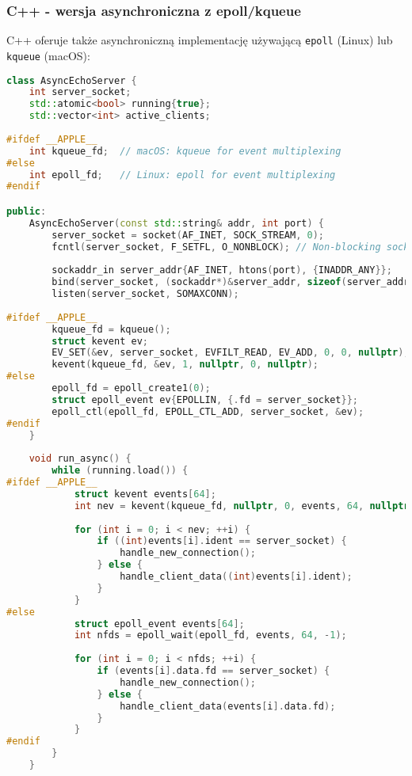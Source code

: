 \subsubsection{C++ - wersja asynchroniczna z epoll/kqueue}
C++ oferuje także asynchroniczną implementację używającą \texttt{epoll} (Linux) lub \texttt{kqueue} \mbox{(macOS)}:
\begin{lstlisting}[language=C++, style=VS2017,  caption={Async Echo Serwer w C++ z event loop}, label={lst:cpp_async_echo_server}]
class AsyncEchoServer {
    int server_socket;
    std::atomic<bool> running{true};
    std::vector<int> active_clients;
    
#ifdef __APPLE__
    int kqueue_fd;  // macOS: kqueue for event multiplexing
#else
    int epoll_fd;   // Linux: epoll for event multiplexing  
#endif

public:
    AsyncEchoServer(const std::string& addr, int port) {
        server_socket = socket(AF_INET, SOCK_STREAM, 0);
        fcntl(server_socket, F_SETFL, O_NONBLOCK); // Non-blocking socket
        
        sockaddr_in server_addr{AF_INET, htons(port), {INADDR_ANY}};
        bind(server_socket, (sockaddr*)&server_addr, sizeof(server_addr));
        listen(server_socket, SOMAXCONN);
        
#ifdef __APPLE__
        kqueue_fd = kqueue();
        struct kevent ev;
        EV_SET(&ev, server_socket, EVFILT_READ, EV_ADD, 0, 0, nullptr);
        kevent(kqueue_fd, &ev, 1, nullptr, 0, nullptr);
#else
        epoll_fd = epoll_create1(0);
        struct epoll_event ev{EPOLLIN, {.fd = server_socket}};
        epoll_ctl(epoll_fd, EPOLL_CTL_ADD, server_socket, &ev);
#endif
    }
    
    void run_async() {
        while (running.load()) {
#ifdef __APPLE__
            struct kevent events[64];
            int nev = kevent(kqueue_fd, nullptr, 0, events, 64, nullptr);
            
            for (int i = 0; i < nev; ++i) {
                if ((int)events[i].ident == server_socket) {
                    handle_new_connection();
                } else {
                    handle_client_data((int)events[i].ident);
                }
            }
#else
            struct epoll_event events[64];
            int nfds = epoll_wait(epoll_fd, events, 64, -1);
            
            for (int i = 0; i < nfds; ++i) {
                if (events[i].data.fd == server_socket) {
                    handle_new_connection();
                } else {
                    handle_client_data(events[i].data.fd);
                }
            }
#endif
        }
    }
    

\end{lstlisting}
